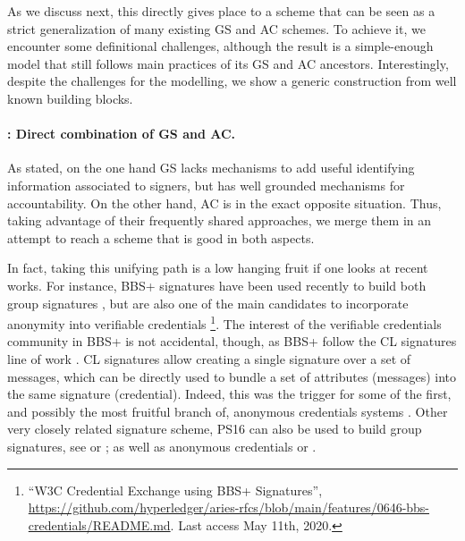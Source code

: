 As we discuss next, this directly gives place to a scheme that can be seen as a
strict generalization of many existing GS and AC schemes. To achieve it, we
encounter some definitional challenges, although the result is a simple-enough
model that still follows main practices of its GS and AC ancestors.
Interestingly, despite the challenges for the modelling, we show a generic
construction from well known building blocks.

\paragraph{\GSAC: Direct combination of GS and AC.} %
As stated, on the one hand GS lacks mechanisms to add useful identifying
information associated to signers, but has well grounded mechanisms for
accountability. On the other hand, AC is in the exact opposite situation. Thus,
taking advantage of their frequently shared approaches, we merge them in an
attempt to reach a scheme that is good in both aspects.

In fact, taking this unifying path is a low hanging fruit if one looks at recent
works. For instance, BBS+ signatures \cite{asm06,cdl16b} have been used recently
to build both group signatures \cite{gl19,dl21,fgl21}, but are also one of the
main candidates to incorporate anonymity into verifiable credentials%
\footnote{``W3C Credential Exchange using BBS+ Signatures'',
  \url{https://github.com/hyperledger/aries-rfcs/blob/main/features/0646-bbs-credentials/README.md}. Last access May 11th, 2020.}.%
The interest of the verifiable credentials community in BBS+ is not accidental,
though, as BBS+ follow the CL signatures line of work \cite{cl02}. CL signatures
allow creating a single signature over a set of messages, which can be directly
used to bundle a set of attributes (messages) into the same signature
(credential). Indeed, this was the trigger for some of the first, and possibly
the most fruitful branch of, anonymous credentials systems \cite{cl01,cl04}
\needcite. Other very closely related signature scheme, PS16 \cite{ps16} can
also be used to build group signatures, see \cite[Appendix A.1]{ps15} or
\cite{cdl+20}; as well as anonymous credentials \cite[Appendix A.2]{ps15} or
\cite{sms+19}.

